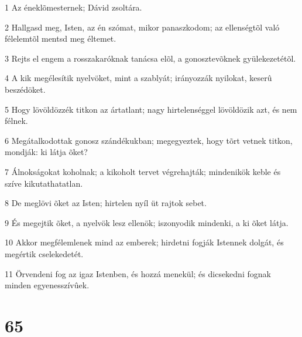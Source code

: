 \par 1 Az éneklõmesternek; Dávid zsoltára.
\par 2 Hallgasd meg, Isten, az én szómat, mikor panaszkodom; az ellenségtõl való félelemtõl mentsd meg éltemet.
\par 3 Rejts el engem a rosszakaróknak tanácsa elõl, a gonosztevõknek gyülekezetétõl.
\par 4 A kik megélesítik nyelvöket, mint a szablyát; irányozzák nyilokat, keserû beszédöket.
\par 5 Hogy lövöldözzék titkon az ártatlant; nagy hirtelenséggel lövöldözik azt, és nem félnek.
\par 6 Megátalkodottak gonosz szándékukban; megegyeztek, hogy tõrt vetnek titkon, mondják: ki látja õket?
\par 7 Álnokságokat koholnak; a kikoholt tervet végrehajták; mindenikök keble és szíve kikutathatatlan.
\par 8 De meglövi õket az Isten; hirtelen nyíl üt rajtok sebet.
\par 9 És megejtik õket, a nyelvök lesz ellenök; iszonyodik mindenki, a ki õket látja.
\par 10 Akkor megfélemlenek mind az emberek; hirdetni fogják Istennek dolgát, és megértik cselekedetét.
\par 11 Örvendeni fog az igaz Istenben, és hozzá menekül; és dicsekedni fognak minden egyenesszívûek.

\chapter{65}

